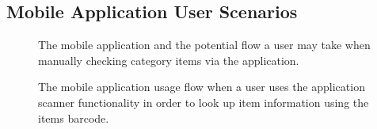 \documentclass[a4paper,11pt]{report}
\begin{document}
\begin{appendix}
    \chapter{Mobile Application User Scenarios}
    \label{appendix:mobileUI}
    
    \begin{figure}
        \caption{The mobile application and the potential flow a user may take when manually checking category items via the application.}
        \label{appendix:scenario1}
    \end{figure}

    \begin{figure}
        \caption{The mobile application usage flow when a user uses the application scanner functionality in order to look up item information using the items barcode.}
        \label{appendix:scenario2}
    \end{figure}


\end{appendix}
\end{document}
